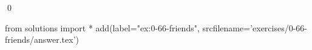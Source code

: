 
\begin{ex}
  \label{ex:0-66-friends}
  
  \qed
\end{ex}
\begin{python0}
from solutions import *
add(label="ex:0-66-friends",
    srcfilename='exercises/0-66-friends/answer.tex')
\end{python0}

